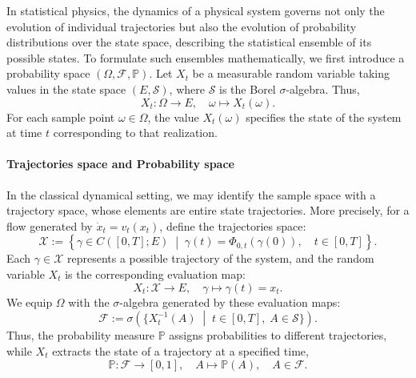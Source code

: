 \documentclass[12pt,a4paper,oneside]{book}
\begin{document}
In statistical physics, the dynamics of a physical system governs not only the evolution of individual trajectories but 
also the evolution of probability distributions over the state space, describing the statistical ensemble of its possible 
states. To formulate such ensembles mathematically, we first introduce a probability space $(\Omega,\mathcal F,\mathbb P)$. 
Let $X_t$ be a measurable random variable taking values in the state space $(E,\mathcal S)$, where $\mathcal S$ is the Borel 
$\sigma$-algebra. Thus,
\begin{equation*}
    X_t:\Omega\to E, \quad \omega\mapsto X_t(\omega).
\end{equation*}
For each sample point $\omega\in\Omega$, the value $X_t(\omega)$ specifies the state of the system at time  $t$ corresponding 
to that realization.

\paragraph{Trajectories space and Probability space}

In the classical dynamical setting, we may identify the sample space with a trajectory space, whose elements are entire
state trajectories. More precisely, for a flow generated by $\dot x_t=v_t(x_t)$, define the trajectories space: 
\begin{equation*}
    \mathcal X :=
    \left\{
        \gamma\in C([0,T]; E) \;\middle|\; \gamma(t)=\Phi_{0,t}(\gamma(0)), \quad t\in[0,T]
    \right\}.
\end{equation*}
Each $\gamma\in\mathcal X$ represents a possible trajectory of the system, and the random variable $X_t$ is the corresponding
evaluation map:
\begin{equation*}
    X_t:\mathcal X \to E, \quad \gamma\mapsto\gamma(t)=x_t.
\end{equation*}
We equip $\Omega$ with the $\sigma$-algebra generated by these evaluation maps:
\begin{equation*}
    \mathcal F:=\sigma\left(
        \{ X_t^{-1}(A) \;\middle|\; t\in[0,T],\; A\in\mathcal S \}
    \right).
\end{equation*}
Thus, the probability measure $\mathbb P$ assigns probabilities to different trajectories, while $X_t$ extracts the state
of a trajectory at a specified time, 
\begin{equation*}
    \mathbb P:\mathcal F\to[0,1], \quad A\mapsto\mathbb P(A), \quad A\in\mathcal F.
\end{equation*}
\end{document}
